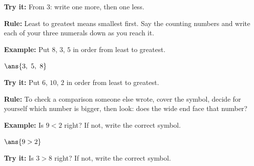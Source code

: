 \documentclass[12pt]{article}
\begin{document}
\begin{tryitbox}
\textbf{Try it:} \quad From $3$: write one more, then one less.\\[2pt]
\end{tryitbox}


\begin{formulabox}
\textbf{Rule:} Least to greatest means smallest first. Say the counting numbers and write each of your three numerals down as you reach it.
\end{formulabox}

\begin{examplebox}
\textbf{Example:} \quad Put $8$, $3$, $5$ in order from least to greatest.

$\ans{3,\ 5,\ 8}$
\end{examplebox}

\begin{tryitbox}
\textbf{Try it:} \quad Put $6$, $10$, $2$ in order from least to greatest.\\[2pt]
\end{tryitbox}


\begin{formulabox}
\textbf{Rule:} To check a comparison someone else wrote, cover the symbol, decide for yourself which number is bigger, then look: does the wide end face that number?
\end{formulabox}

\begin{examplebox}
\textbf{Example:} \quad Is $9 < 2$ right? If not, write the correct symbol.

$\ans{9 > 2}$
\end{examplebox}

\begin{tryitbox}
\textbf{Try it:} \quad Is $3 > 8$ right? If not, write the correct symbol.\\[2pt]
\end{tryitbox}
\end{document}
